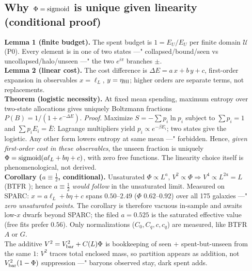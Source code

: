 \documentclass[twocolumn]{aastex631}
\begin{document}
\subsection{Why $\Phi={\rm sigmoid}$ is unique given linearity (conditional proof)}
\textbf{Lemma 1 (finite budget).} The spent budget is $1=E_U/E_U$ per finite domain $\mathcal U$ (P0). Every element is in one of two states ---" collapsed/bound/seen vs uncollapsed/halo/unseen ---" the two $e^{i\pi}$ branches $\pm$. \\
\textbf{Lemma 2 (linear cost).} The cost difference is $\Delta E=a\,x+b\,y+c$, first-order expansion in observables $x=\ell_L$, $y=\eta_{\rm HI}$; higher orders are separate terms, not replacements. \\
\textbf{Theorem (logistic necessity).} At fixed mean spending, maximum entropy over two-state allocations gives uniquely Boltzmann fractions $P(B)=1/(1+e^{-\Delta E})$. \emph{Proof.} Maximize $S=-\sum p_i\ln p_i$ subject to $\sum p_i=1$ and $\sum p_iE_i=\bar E$: Lagrange multipliers yield $p_i\propto e^{-\beta E_i}$; two states give the logistic. Any other form lowers entropy at same mean ---" forbidden. Hence, \emph{given first-order cost in these observables}, the unseen fraction is uniquely $\Phi={\rm sigmoid}(a\ell_{L}+b\eta+c)$, with zero free functions. The linearity choice itself is phenomenological, not derived. \\
\textbf{Corollary ($a\equiv\frac12$, conditional).} Unsaturated $\Phi\propto L^{a}$, $V^{2}\propto\Phi\Rightarrow V^{4}\propto L^{2a}=L$ (BTFR \cite{BTFR}); hence $a\equiv\frac12$ \emph{would follow} in the unsaturated limit. Measured on SPARC: $x=a\ell_{L}+b\eta+c$ spans $0.50$--$2.49$ ($\Phi$ $0.62$--$0.92$) over all 175 galaxies ---" \emph{zero unsaturated points}. The corollary is therefore vacuous in-sample and awaits low-$x$ dwarfs beyond SPARC; the filed $a=0.525$ is the saturated effective value (free fits prefer $0.56$). Only normalizations ($C_{0},C_{q},c,c_{q}$) are measured, like BTFR $A$ or $G$. \\
The additive $V^{2}=V_{\rm bar}^{2}+C(L)\Phi$ is bookkeeping of seen $+$ spent-but-unseen from the same $1$: $V^{2}$ traces total enclosed mass, so partition appears as addition, not $V_{\rm bar}^{2}(1-\Phi)$ suppression ---" baryons observed stay, dark spent adds.
\end{document}
